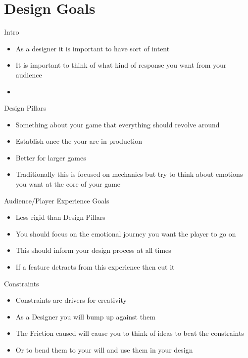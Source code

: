 \part{Design Goals}
\frame{\partpage}

\begin{frame}{Intro}
	\begin{itemize}
		\item As a designer it is important to have sort of intent
		\item It is important to think of what kind of response you want from your audience
		\item 
	\end{itemize}
\end{frame}

\begin{frame}{Design Pillars}
	\begin{itemize}
		\item Something about your game that everything should revolve around
		\item Establish once the your are in production
		\item Better for larger games
		\item Traditionally this is focused on mechanics but try to think about emotions you want at the core of your game
	\end{itemize}
\end{frame}

\begin{frame}{Audience/Player Experience Goals}
	\begin{itemize}
		\item Less rigid than Design Pillars
		\item You should focus on the emotional journey you want the player to go on
		\item This should inform your design process at all times
		\item If a feature detracts from this experience then cut it
	\end{itemize}
\end{frame}

\begin{frame}{Constraints}
	\begin{itemize}
		\item Constraints are drivers for creativity
		\item As a Designer you will bump up against them
		\item The Friction caused will cause you to think of ideas to beat the constraints
		\item Or to bend them to your will and use them in your design
	\end{itemize}
\end{frame}

